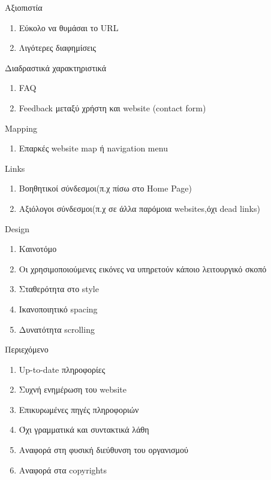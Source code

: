 	\item Αξιοπιστία
	\begin{enumerate}
		\item Εύκολο να θυμάσαι το URL
		\item Λιγότερες διαφημίσεις 
	\end{enumerate}
	\item Διαδραστικά χαρακτηριστικά
	\begin{enumerate}
		\item FAQ
		\item Feedback μεταξύ χρήστη και website (contact form)
	\end{enumerate}
	\item Mapping
	\begin{enumerate}
		\item Επαρκές website map ή navigation menu
	\end{enumerate}
	\item Links
	\begin{enumerate}
		\item Βοηθητικοί σύνδεσμοι(π.χ πίσω στο Home Page)
		\item Αξιόλογοι σύνδεσμοι(π.χ σε άλλα παρόμοια websites,όχι dead links)
	\end{enumerate}
	\item Design
	\begin{enumerate}
		\item Καινοτόμο 
		\item Οι χρησιμοποιούμενες εικόνες να υπηρετούν κάποιο λειτουργικό σκοπό
		\item Σταθερότητα στο style
		\item Ικανοποιητικό spacing
		\item Δυνατότητα scrolling
	\end{enumerate}
	\item Περιεχόμενο
	\begin{enumerate}
		\item Up-to-date πληροφορίες
		\item Συχνή ενημέρωση του website
		\item Επικυρωμένες πηγές πληροφοριών
		\item Όχι γραμματικά και συντακτικά λάθη
		\item Αναφορά στη φυσική διεύθυνση του οργανισμού
		\item Αναφορά στα copyrights
	\end{enumerate}
